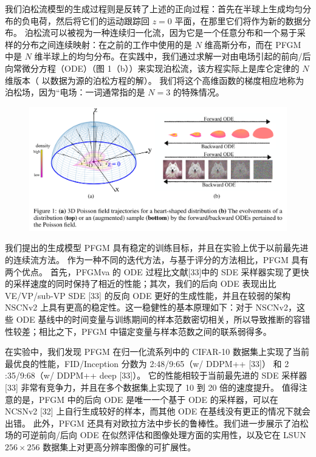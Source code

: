 \documentclass[hyperref,UTF-8]{ctexart}
\newcommand{\0}{\boldsymbol{0}}
\begin{document}
我们泊松流模型的生成过程则是反转了上述的正向过程：首先在半球上生成均匀分布的负电荷，然后将它们的运动跟踪回 $z = 0$ 平面，在那里它们将作为新的数据分布。 泊松流可以被视为一种连续归一化流，因为它是一个任意分布和一个易于采样的分布之间连续映射：在之前的工作中使用的是 $N$ 维高斯分布，而在 PFGM 中是 $N$ 维半球上的均匀分布。在实践中，我们通过求解一对由电场引起的前向/后向常微分方程（ODE）（图 1（b））来实现泊松流，该方程实际上是库仑定律的 $N$ 维版本（ 以数据为源的泊松方程的解）。 我们将这个高维函数的梯度相应地称为泊松场，因为“电场：一词通常指的是 $N = 3$ 的特殊情况。

\begin{figure}[ht]
  \centering
  \includegraphics[width=1\textwidth]{img/figure1.png}
\end{figure}

我们提出的生成模型 PFGM 具有稳定的训练目标，并且在实验上优于以前最先进的连续流方法。 作为一种不同的迭代方法，与基于评分的方法相比，PFGM 具有两个优点。 首先，PFGMva 的 ODE 过程比文献[33]中的 SDE 采样器实现了更快的采样速度的同时保持了相近的性能；其次，我们的后向 ODE 表现出比 VE/VP/sub-VP SDE [33] 的反向 ODE 更好的生成性能，并且在较弱的架构 NSCNv2 上具有更高的稳定性。这一稳健性的基本原理如下：对于 NSCNv2，这些 ODE 基线中的时间变量与训练期间的样本范数密切相关，所以导致推断的容错性较差；相比之下，PFGM 中锚定变量与样本范数之间的联系弱得多。

在实验中，我们发现 PFGM 在归一化流系列中的 CIFAR-10 数据集上实现了当前最优良的性能，FID/Inception 分数为 2:48/9:65（w/ DDPM++ [33]） 和 2 :35/9:68（w/ DDPM++ deep [33]）。 它的性能相较于当前最先进的 SDE 采样器 [33] 非常有竞争力，并且在多个数据集上实现了 10 到 20 倍的速度提升。 值得注意的是，PFGM 中的后向 ODE 是唯一一个基于 ODE 的采样器，可以在 NCSNv2 [32] 上自行生成较好的样本，而其他 ODE 在基线没有更正的情况下就会出错。 此外，PFGM 还具有对欧拉方法中步长的鲁棒性。我们进一步展示了泊松场的可逆前向/后向 ODE 在似然评估和图像处理方面的实用性，以及它在 LSUN $256 \times 256$ 数据集上对更高分辨率图像的可扩展性。
\end{document}
